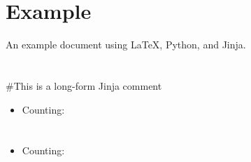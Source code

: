\documentclass{article}
\begin{document}
\section{Example}
An example document using \LaTeX, Python, and Jinja.

\section{}
\#{This is a long-form Jinja comment}
\begin{itemize}
  \item Counting: 
\end{itemize}

\section{}
\begin{itemize}
  \item Counting: 
\end{itemize}

\end{document}
